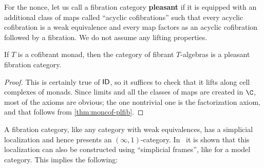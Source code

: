 \documentclass{amsart}
\begin{document}
For the nonce, let us call a fibration category \textbf{pleasant} if it is equipped with an additional class of maps called ``acyclic cofibrations'' such that every acyclic cofibration is a weak equivalence and every map factors as an acyclic cofibration followed by a fibration.
We do not assume any lifting properties.

\begin{cor}
  If $T$ is a cofibrant monad, then the category of fibrant $T$-algebras is a pleasant fibration category.
\end{cor}
\begin{proof}
  This is certainly true of $\mathsf{ID}$, so it suffices to check that it lifts along cell complexes of monads.
  Since limits and all the classes of maps are created in $\C$, most of the axioms are obvious; the one nontrivial one is the factorization axiom, and that follows from \cref{thm:moncof-plfib}.
\end{proof}

A fibration category, like any category with weak equivalences, has a simplicial localization and hence presents an $(\infty,1)$-category.
In~\cite{szumilo:cocompl-hoth} it is shown that this localization can also be constructed using ``simplicial frames'', like for a model category.
This implies the following:
\end{document}
